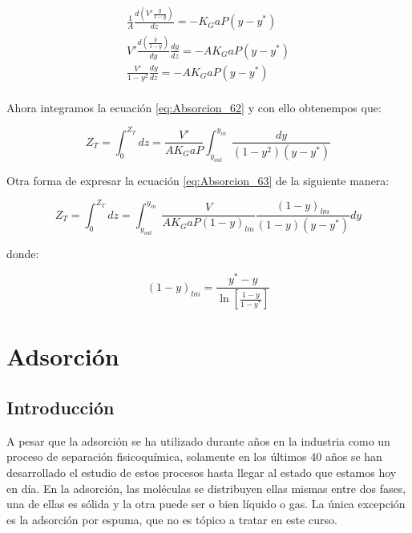\documentclass[11pt]{book}
\begin{document}
\begin{align}
    \label{eq:Absorcion_62}
    \frac{1}{A} \frac{d \left( V' \frac{y}{1-y}\right)}{dz} = -K_G a P (y-y^*) \\
    V' \frac{d \left( \frac{y}{1-y}\right)}{dy} \frac{dy}{dz} = -A K_G a P (y-y^*) \\
    \frac{V'}{1-y^2} \frac{dy}{dz} = -A K_G a P (y-y^*) \\
\end{align}
    
Ahora integramos la ecuación \ref{eq:Absorcion_62} y con ello obtenempos que:

\begin{equation}
    \label{eq:Absorcion_63}
    Z_T = \int_{0}^{Z_T} dz = \frac{V'}{A K_G a P} \int_{y_{out}}^{y_{in}} \frac{dy}{(1-y^2) (y-y^*)}
\end{equation}

Otra forma de expresar la ecuación \ref{eq:Absorcion_63} de la siguiente manera:

\begin{equation}
    \label{eq:Absorcion_64}
    Z_T = \int_{0}^{Z_T} dz  = \int_{y_{out}}^{y_{in}} \frac{V}{A K_G a P (1-y)_{lm}} \frac{(1-y)_{lm}}{(1-y)(y-y^*)} dy
\end{equation}

donde:

\begin{equation*}
    (1-y)_{lm} = \frac{y^* - y}{\ln \left[ \frac{1-y}{1-y^*}\right]}
\end{equation*}







\chapter{Adsorción}

\section{Introducción}

A pesar que la adsorción se ha utilizado durante años en la industria como un proceso de separación fisicoquímica, solamente en los últimos 40 años se han desarrollado el estudio de estos procesos hasta llegar al estado que estamos hoy en día. En la adsorción, las moléculas se distribuyen ellas mismas entre dos fases, una de ellas es sólida y la otra puede ser o bien líquido o gas. La única excepción es la adsorción por espuma, que no es tópico a tratar en este curso.
\end{document}
